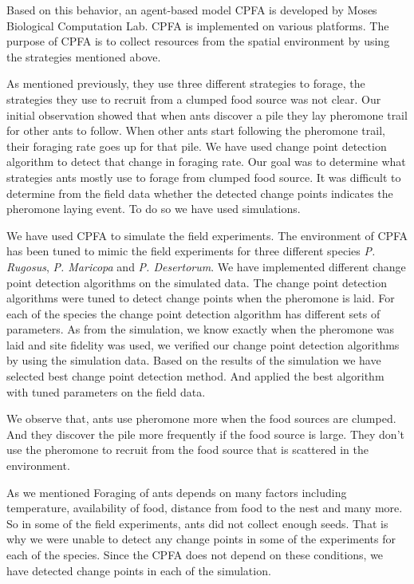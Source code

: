 Based on this behavior, an agent-based model CPFA\cite{hecker2015beyond} is developed by Moses Biological Computation Lab. CPFA is implemented on various platforms. The purpose of CPFA is to collect resources from the spatial environment by using the strategies mentioned above. 

As mentioned previously, they use three different strategies to forage\cite{collett2010desert,flanagan2012quantifying}, the strategies they use to recruit from a clumped food source\cite{tarasewich2002swarm} was not clear. Our initial observation showed that when ants discover a pile they lay pheromone trail for other ants to follow. When other ants start following the pheromone trail, their foraging rate goes up for that pile. We have used change point detection algorithm to detect that change in foraging rate. Our goal was to determine what strategies ants mostly use to forage from clumped food source. It was difficult to determine from the field data whether the detected change points indicates the pheromone laying event. To do so we have used simulations. 

We have used CPFA to simulate the field experiments. The environment of CPFA has been tuned to mimic the field experiments for three different species \textit{P. Rugosus}, \textit{P. Maricopa} and \textit{P. Desertorum}. We have implemented different change point detection algorithms on the simulated data\cite{fryzlewicz2014wild, scott1974cluster, kukulski2000normal}. The change point detection algorithms were tuned to detect change points when the pheromone is laid. For each of the species the change point detection algorithm has different sets of parameters. As from the simulation, we know exactly when the pheromone was laid and site fidelity was used, we verified our change point detection algorithms by using the simulation data. Based on the results of the simulation we have selected best change point detection method. And applied the best algorithm with tuned parameters on the field data. 

We observe that, ants use pheromone more when the food sources are clumped. And they discover the pile more frequently if the food source is large. They don't use the pheromone to recruit from the food source that is scattered in the environment. 

As we mentioned Foraging of ants depends on many factors including temperature, availability of food, distance from food to the nest and  many more\cite{whitford1975factors,gordon1996founding}. So in some of the field experiments, ants did not collect enough seeds. That is why we were unable to detect any change points in some of the experiments for each of the species. Since the CPFA does not depend on these conditions, we have detected change points in each of the simulation.
\clearpage
